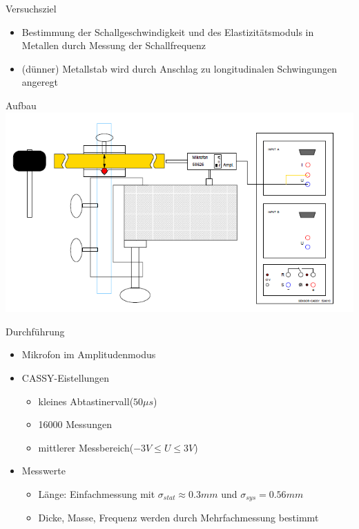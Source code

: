 \documentclass[12pt]{beamer}
\begin{document}
	
	
	
	
	
	
	
	
	
\begin{frame}{Versuchsziel}
\begin{itemize}
\item Bestimmung der Schallgeschwindigkeit und des Elastizitätsmoduls in Metallen durch Messung der Schallfrequenz
\item (dünner) Metallstab wird durch Anschlag zu longitudinalen Schwingungen angeregt 
\end{itemize}
\end{frame}

\begin{frame}{Aufbau}
\includegraphics[width=\linewidth,height=\textheight,keepaspectratio]{Bilder/AufbauMessungSchallgeschwindigkeitMetallstab.PNG}
\centering
\end{frame}

\begin{frame}{Durchführung}
\begin{itemize}
\item Mikrofon im Amplitudenmodus
\item CASSY-Eistellungen
\begin{itemize}
\item kleines Abtastinervall($50\mu s$)
\item 16000 Messungen
\item mittlerer Messbereich($-3V\leq U\leq 3V$)
\end{itemize}
\item Messwerte
\begin{itemize}
\item Länge: Einfachmessung mit $\sigma_{stat}\approx0.3mm$ und $\sigma_{sys}=0.56mm$
\item Dicke, Masse, Frequenz werden durch Mehrfachmessung bestimmt
\end{itemize}
\end{itemize}
\end{frame}
\end{document}
